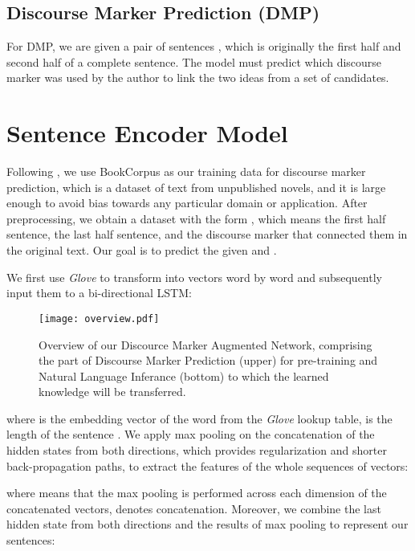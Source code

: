 \documentclass[11pt,letterpaper]{article}
\begin{document}
\subsection{Discourse Marker Prediction (DMP)}
For DMP, we are given a pair of sentences , which is originally the first half and second half of a complete sentence. The model must predict which discourse marker was used by the author to link the two ideas from a set of candidates.

\section{Sentence Encoder Model}
\label{sec3}
Following \cite{nie2017dissent,kiros2015skip}, we use BookCorpus\cite{zhu2015aligning} as our training data for discourse marker prediction, which is a dataset of text from unpublished novels, and it is large enough to avoid bias towards any particular domain or application. After preprocessing, we obtain a dataset with the form , which means the first half sentence, the last half sentence, and the discourse marker that connected them in the original text. Our goal is to predict the  given  and .

We first use \emph{Glove}\cite{pennington2014glove} to transform  into vectors word by word and subsequently input them to a bi-directional LSTM:


\begin{figure*}[t]
	\begin{center}
		\texttt{[image: overview.pdf]}
		\caption{\label{fig1} Overview of our Discource Marker Augmented Network, comprising the part of Discourse Marker Prediction (upper) for pre-training and Natural Language Inferance (bottom) to which the learned knowledge will be transferred.}
	\end{center}
\end{figure*}

where  is the embedding vector of the word  from the \emph{Glove} lookup table,  is the length of the sentence . We apply max pooling on the concatenation of the hidden states from both directions, which provides regularization and shorter back-propagation paths\cite{collobert2008unified}, to extract the features of the whole sequences of vectors:

where  means that the max pooling is performed across each dimension of the concatenated vectors,  denotes concatenation. Moreover, we combine the last hidden state from both directions and the results of max pooling to represent our sentences:
\end{document}
